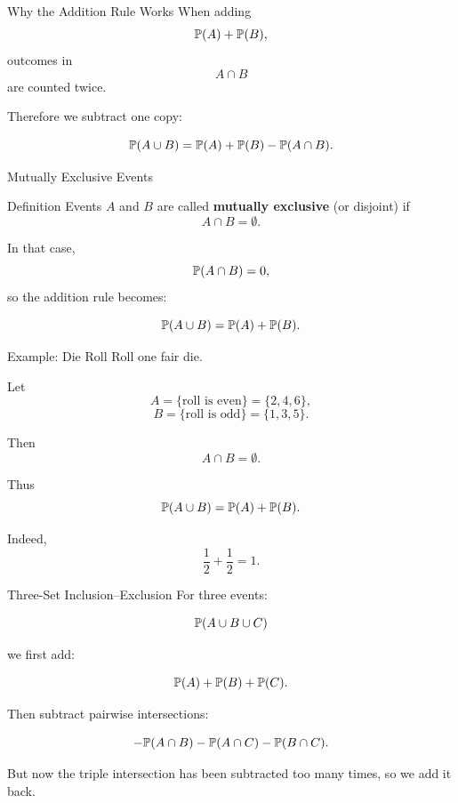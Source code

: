 \begin{frame}{Why the Addition Rule Works}
When adding
\[
\mathbb{P}(A)+\mathbb{P}(B),
\]
outcomes in
\[
A\cap B
\]
are counted twice.

\vspace{0.25cm}

Therefore we subtract one copy:

\[
\mathbb{P}(A\cup B)
=
\mathbb{P}(A)+\mathbb{P}(B)-\mathbb{P}(A\cap B).
\]
\end{frame}


\begin{frame}{Mutually Exclusive Events}
\begin{keybox}{Definition}
Events $A$ and $B$ are called \textbf{mutually exclusive} (or disjoint) if
\[
A\cap B=\emptyset.
\]
\end{keybox}

\vspace{0.25cm}

In that case,
\[
\mathbb{P}(A\cap B)=0,
\]
so the addition rule becomes:

\[
\mathbb{P}(A\cup B)
=
\mathbb{P}(A)+\mathbb{P}(B).
\]
\end{frame}

\begin{frame}{Example: Die Roll}
Roll one fair die.

Let
\[
A=\{\text{roll is even}\}=\{2,4,6\},
\]
\[
B=\{\text{roll is odd}\}=\{1,3,5\}.
\]

Then
\[
A\cap B=\emptyset.
\]

Thus
\[
\mathbb{P}(A\cup B)
=
\mathbb{P}(A)+\mathbb{P}(B).
\]

Indeed,
\[
\frac12+\frac12=1.
\]
\end{frame}


\begin{frame}{Three-Set Inclusion--Exclusion}
For three events:

\[
\mathbb{P}(A\cup B\cup C)
\]

we first add:

\[
\mathbb{P}(A)+\mathbb{P}(B)+\mathbb{P}(C).
\]

\vspace{0.25cm}

Then subtract pairwise intersections:

\[
-\mathbb{P}(A\cap B)
-\mathbb{P}(A\cap C)
-\mathbb{P}(B\cap C).
\]

\vspace{0.25cm}

But now the triple intersection has been subtracted too many times, so we add it back.
\end{frame}

